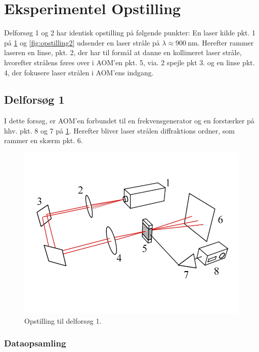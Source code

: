 \documentclass[main]{subfiles}
\begin{document}
\section{Eksperimentel Opstilling}
Delforsøg 1 og 2 har identisk opstilling på følgende punkter: En laser kilde pkt. 1 på \cref{fig:opstilling1} og \cref{fig:opstilling2} udsender en laser stråle på $\lambda \approx  \SI{900}{\nano\m} $. Herefter rammer laseren en linse, pkt. 2, der har til formål at danne en kollimeret laser stråle, hvorefter strålens føres over i AOM'en pkt. 5, via. 2 spejle pkt 3. og en linse pkt. 4, der fokusere laser strålen i AOM'ens indgang.

\subsection{Delforsøg 1}
I dette forsøg, er AOM'en forbundet til en frekvensgenerator og en forstærker på hhv. pkt. 8 og 7 på \cref{fig:opstilling1}. Herefter bliver laser strålen diffraktions ordner, som rammer en skærm pkt. 6.
\begin{figure}[H]
    \includegraphics[width=\linewidth]{tegninger/tegning1.png}
    \caption{Opstilling til delforsøg 1.}
    \label{fig:opstilling1}
\end{figure}

\subsubsection{Dataopsamling}
\end{document}

